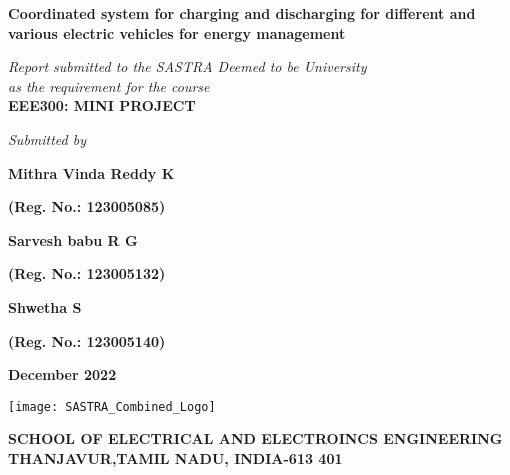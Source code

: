 \documentclass[a4paper, 12pt, oneside]{sastra}
\begin{document}
	
	
	\thispagestyle{empty}
	\begin{center}
		\Large{\textbf{Coordinated system for charging and discharging for different and various electric vehicles for energy management}}
	\end{center}
	\bigskip{}
	\bigskip{}
	\bigskip{}
	\begin{center}
		\textit{Report submitted to the SASTRA Deemed to be University\\ 
			as the requirement for the course\\
		}
		\bigskip{}
		\bigskip{}
		\large{\textbf{EEE300: MINI PROJECT}}
		\bigskip{}
		\bigskip{}
		\bigskip{}
		\bigskip{}
		\bigskip{}
		\bigskip{}
	\end{center}
	\begin{center}
		\textit{Submitted by}\\
	\end{center}
	\begin{center}
		\begin{singlespacing}
			\textbf{\Large{Mithra Vinda Reddy K}}
			
			\textbf{\large{(Reg. No.: 123005085)}}
			
			\textbf{\Large{Sarvesh babu R G}}
			
			\textbf{\large{(Reg. No.: 123005132)}}
			
			\textbf{\Large{Shwetha S}}
			
			\textbf{\large{(Reg. No.: 123005140)}}
		\end{singlespacing}
	\end{center}
	\bigskip{}
	
	\begin{center}
		\Large{\textbf{December 2022}}   %
	\end{center}
	\bigskip{}
	\begin{center}
		\texttt{[image: SASTRA\_Combined\_Logo]}
	\end{center}
	
	\begin{center}
		\large{\textbf{SCHOOL OF ELECTRICAL AND ELECTROINCS ENGINEERING}} %
		{\textbf{THANJAVUR,TAMIL NADU, INDIA-613 401}}
	\end{center}
	
\end{document}
